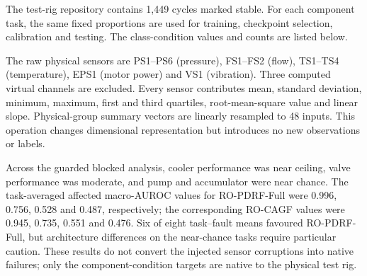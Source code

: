 \documentclass[10pt]{article}
\begin{document}
The test-rig repository contains 1,449 cycles marked stable. For each component task, the same fixed proportions are used for training, checkpoint selection, calibration and testing. The class-condition values and counts are listed below.

\begin{table}[ht]
\centering
\caption{Hydraulic cooler and valve condition values and split counts.}
\begin{minipage}{0.47\textwidth}\centering\resizebox{\textwidth}{!}{}\end{minipage}\hfill
\begin{minipage}{0.47\textwidth}\centering\resizebox{\textwidth}{!}{}\end{minipage}
\end{table}

\begin{table}[ht]
\centering
\caption{Hydraulic pump and accumulator condition values and split counts.}
\begin{minipage}{0.47\textwidth}\centering\resizebox{\textwidth}{!}{}\end{minipage}\hfill
\begin{minipage}{0.47\textwidth}\centering\resizebox{\textwidth}{!}{}\end{minipage}
\end{table}

The raw physical sensors are PS1--PS6 (pressure), FS1--FS2 (flow), TS1--TS4 (temperature), EPS1 (motor power) and VS1 (vibration). Three computed virtual channels are excluded. Every sensor contributes mean, standard deviation, minimum, maximum, first and third quartiles, root-mean-square value and linear slope. Physical-group summary vectors are linearly resampled to 48 inputs. This operation changes dimensional representation but introduces no new observations or labels.

\begin{table}[ht]
\centering
\caption{Paired hydraulic PDRF-NOQ minus CAGF macro-AUROC effects. The minimum attainable non-zero two-sided exact Wilcoxon value with five same-direction pairs is 0.0625.}
\resizebox{0.78\textwidth}{!}{}
\end{table}

Across the guarded blocked analysis, cooler performance was near ceiling, valve performance was moderate, and pump and accumulator were near chance. The task-averaged affected macro-AUROC values for RO-PDRF-Full were 0.996, 0.756, 0.528 and 0.487, respectively; the corresponding RO-CAGF values were 0.945, 0.735, 0.551 and 0.476. Six of eight task--fault means favoured RO-PDRF-Full, but architecture differences on the near-chance tasks require particular caution. These results do not convert the injected sensor corruptions into native failures; only the component-condition targets are native to the physical test rig.
\end{document}

